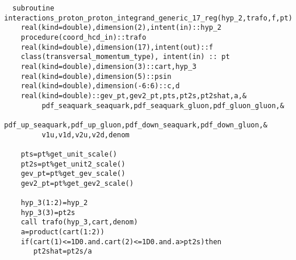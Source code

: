 \begin{Verbatim}
  subroutine interactions_proton_proton_integrand_generic_17_reg(hyp_2,trafo,f,pt)
    real(kind=double),dimension(2),intent(in)::hyp_2
    procedure(coord_hcd_in)::trafo
    real(kind=double),dimension(17),intent(out)::f
    class(transversal_momentum_type), intent(in) :: pt
    real(kind=double),dimension(3)::cart,hyp_3
    real(kind=double),dimension(5)::psin
    real(kind=double),dimension(-6:6)::c,d
    real(kind=double)::gev_pt,gev2_pt,pts,pt2s,pt2shat,a,&
         pdf_seaquark_seaquark,pdf_seaquark_gluon,pdf_gluon_gluon,&
         pdf_up_seaquark,pdf_up_gluon,pdf_down_seaquark,pdf_down_gluon,&
         v1u,v1d,v2u,v2d,denom
        
    pts=pt%get_unit_scale()
    pt2s=pt%get_unit2_scale()
    gev_pt=pt%get_gev_scale()
    gev2_pt=pt%get_gev2_scale()

    hyp_3(1:2)=hyp_2
    hyp_3(3)=pt2s
    call trafo(hyp_3,cart,denom)
    a=product(cart(1:2))
    if(cart(1)<=1D0.and.cart(2)<=1D0.and.a>pt2s)then
       pt2shat=pt2s/a


\end{Verbatim}
